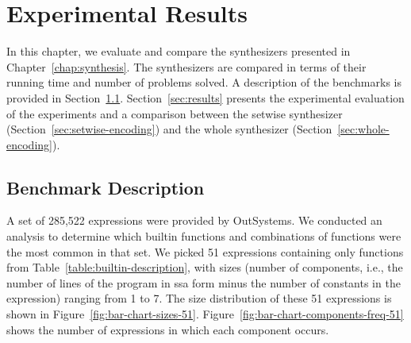 \chapter{Experimental Results}
\label{chap:experimental-results}

In this chapter, we evaluate and compare the synthesizers presented in
Chapter~\ref{chap:synthesis}.
The synthesizers are compared in terms of their running time and number of
problems solved.
A description of the benchmarks is provided in Section~\ref{sec:bench-desc}.
Section~\ref{sec:results} presents the experimental evaluation of the
experiments and a comparison between the setwise synthesizer
(Section~\ref{sec:setwise-encoding}) and the whole synthesizer
(Section~\ref{sec:whole-encoding}).

\section{Benchmark Description}
\label{sec:bench-desc}

A set of 285,522 expressions were provided by OutSystems.
We conducted an analysis to determine which builtin functions and combinations
of functions were the most common in that set.
We picked 51 expressions containing only functions from
Table~\ref{table:builtin-description}, with sizes (number of components, i.e.,
the number of lines of the program in \gls{ssa} form minus the number of
constants in the expression) ranging from 1 to 7.
The size distribution of these 51 expressions is shown in
Figure~\ref{fig:bar-chart-sizes-51}.
Figure~\ref{fig:bar-chart-components-freq-51} shows the number of expressions in
which each component occurs.

